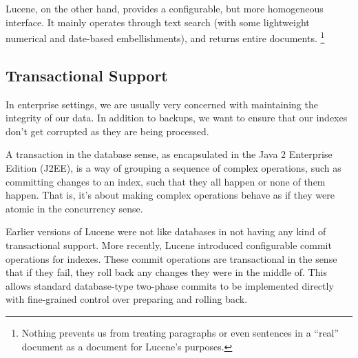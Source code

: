 Lucene, on the other hand, provides a configurable, but more
homogeneous interface.  It mainly operates through text search (with
some lightweight numerical and date-based embellishments), and
returns entire documents.%
%
\footnote{Nothing prevents us from treating paragraphs or even sentences in a
``real'' document as a document for Lucene's purposes.}

\subsection{Transactional Support}

In enterprise settings, we are usually very concerned with maintaining
the integrity of our data.  In addition to backups, we want to ensure
that our indexes don't get corrupted as they are being processed.

A transaction in the database sense, as encapsulated in the Java 2
Enterprise Edition (J2EE), is a way of grouping a sequence of complex
operations, such as committing changes to an index, such that they all
happen or none of them happen.  That is, it's about making complex
operations behave as if they were atomic in the concurrency sense.

Earlier versions of Lucene were not like databases in not having any
kind of transactional support.  More recently, Lucene introduced
configurable commit operations for indexes.  These commit operations
are transactional in the sense that if they fail, they roll back any
changes they were in the middle of.  This allows standard
database-type two-phase commits to be implemented directly with
fine-grained control over preparing and rolling back.

 







